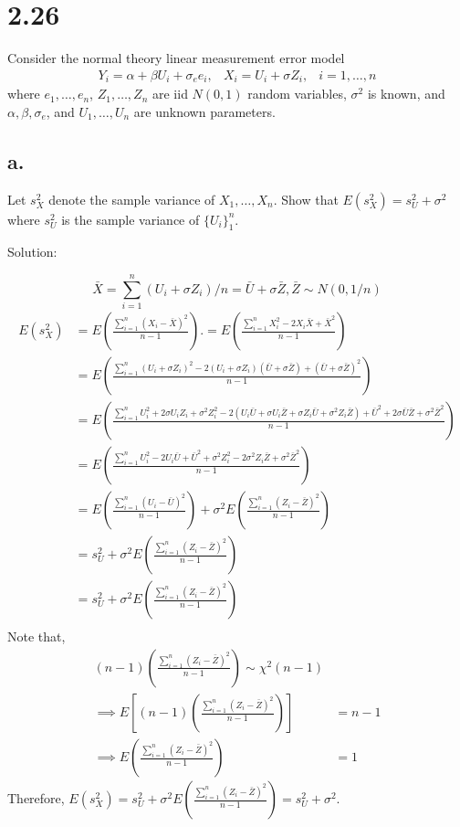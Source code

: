 \documentclass[
  letterpaper,
  DIV=11,
  numbers=noendperiod]{scrreprt}
\begin{document}
\newpage

\hypertarget{section-10}{%
\section{2.26}\label{section-10}}

Consider the normal theory linear measurement error model
\[\begin{aligned} Y_i = \alpha + \beta U_i +\sigma_e e_i, & X_i =U_i+ \sigma Z_i, & i = 1,\dots,n \end{aligned}\]
where \(e_1, \dots, e_n\), \(Z_1,\dots, Z_n\) are iid \(N(0,1)\) random
variables, \(\sigma^2\) is known, and \(\alpha,\beta, \sigma_e\), and
\(U_1, \dots, U_n\) are unknown parameters.

\hypertarget{a.-2}{%
\subsection{a.}\label{a.-2}}

Let \(s_X^2\) denote the sample variance of \(X_1,\dots, X_n\). Show
that \(E(s_X^2)=s_U^2+\sigma^2\) where \(s_U^2\) is the sample variance
of \(\{U_i\}_1^n\).

Solution:

\[
\bar X = \sum_{i=1}^n (U_i+\sigma Z_i)/n = \bar U + \sigma \bar Z, \bar Z \sim N(0,1/n) 
\] \[\begin{aligned}
E(s_X^2) &= E \left(\frac{\sum_{i=1}^n (X_i -\bar X)^2}{n-1} \right).
= E \left(\frac{\sum_{i=1}^n X_i^2 -2X_i\bar X + \bar X^2}{n-1} \right)\\ 
&= E \left(\frac{\sum_{i=1}^n (U_i + \sigma Z_i)^2 -2(U_i + \sigma Z_i)(\bar U + \sigma \bar Z) +(\bar U + \sigma \bar Z)^2}{n-1} \right)\\
&= E \left(\frac{\sum_{i=1}^n U_i^2 + 2\sigma  U_i Z_i+ \sigma^2 Z_i^2 -2(U_i \bar U + \sigma U_i \bar Z +\sigma Z_i \bar U + \sigma^2Z_i \bar Z) +\bar U^2 + 2\sigma \bar U \bar Z + \sigma^2\bar Z^2}{n-1} \right)\\
&= E \left(\frac{\sum_{i=1}^n U_i^2-2U_i \bar U+\bar U^2 + \sigma^2 Z_i^2  -2 \sigma^2Z_i \bar Z  + \sigma^2\bar Z^2}{n-1} \right)\\
&= E \left(\frac{\sum_{i=1}^n(U_i- \bar U)^2}{n-1} \right) + \sigma^2 E \left(\frac{\sum_{i=1}^n(Z_i- \bar Z)^2}{n-1} \right)\\
&= s_U^2 + \sigma^2 E \left(\frac{\sum_{i=1}^n(Z_i- \bar Z)^2}{n-1} \right)\\
&= s_U^2 + \sigma^2 E \left(\frac{\sum_{i=1}^n(Z_i- \bar Z)^2}{n-1} \right)\\
\end{aligned}
\] Note that, \[ \begin{aligned}
(n-1) \left(\frac{\sum_{i=1}^n(Z_i- \bar Z)^2}{n-1} \right)\sim \chi^2(n-1) \\
\implies E \left[(n-1) \left(\frac{\sum_{i=1}^n(Z_i- \bar Z)^2}{n-1} \right)\right] &= n-1 \\
\implies E \left(\frac{\sum_{i=1}^n(Z_i- \bar Z)^2}{n-1} \right) &= 1
\end{aligned}
\] Therefore,
\(E(s_X^2)= s_U^2 + \sigma^2 E \left(\frac{\sum_{i=1}^n(Z_i- \bar Z)^2}{n-1} \right) =s_U^2 + \sigma^2\).
\end{document}
